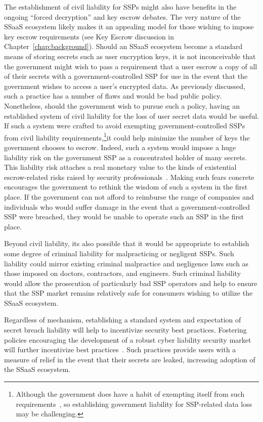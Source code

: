 The establishment of civil liability for SSPs might also have benefits
in the ongoing ``forced decryption'' and key escrow debates. The very
nature of the SSaaS ecosystem likely makes it an appealing model for
those wishing to impose key escrow requirements (see Key Escrow
discussion in Chapter~\ref{chap:background}). Should an SSaaS
ecosystem become a standard means of storing secrets such as user
encryption keys, it is not inconceivable that the government might
wish to pass a requirement that a user escrow a copy of all of their
secrets with a government-controlled SSP for use in the event that the
government wishes to access a user's encrypted data. As previously
discussed, such a practice has a number of flaws and would be bad
public policy. Nonetheless, should the government wish to pursue such
a policy, having an established system of civil liability for the loss
of user secret data would be useful. If such a system were crafted to
avoid exempting government-controlled SSPs from civil liability
requirements,\footnote{Although the government does have a habit of
  exempting itself from such requirements~\cite{sisk2011}, so
  establishing government liability for SSP-related data loss may be
  challenging.}it could help minimize the number of keys the
government chooses to escrow. Indeed, such a system would impose a
huge liability risk on the government SSP as a concentrated holder of
many secrets. This liability risk attaches a real monetary value to
the kinds of existential escrow-related risks raised by security
professionals~\cite{abelson2015}. Making such fears concrete
encourages the government to rethink the wisdom of such a system in
the first place. If the government can not afford to reimburse the
range of companies and individuals who would suffer damage in the
event that a government-controlled SSP were breached, they would be
unable to operate such an SSP in the first place.

Beyond civil liability, its also possible that it would be appropriate
to establish some degree of criminal liability for malpracticing or
negligent SSPs. Such liability could mirror existing criminal
malpractice and negligence laws such as those imposed on doctors,
contractors, and engineers. Such criminal liability would allow the
prosecution of particularly bad SSP operators and help to ensure that
the SSP market remains relatively safe for consumers wishing to
utilize the SSaaS ecosystem.

Regardless of mechanism, establishing a standard system and
expectation of secret breach liability will help to incentivize
security best practices. Fostering policies encouraging the
development of a robust cyber liability security market will further
incentivize best practices~\cite{starks2016}. Such practices provide
users with a measure of relief in the event that their secrets are
leaked, increasing adoption of the SSaaS ecosystem.

